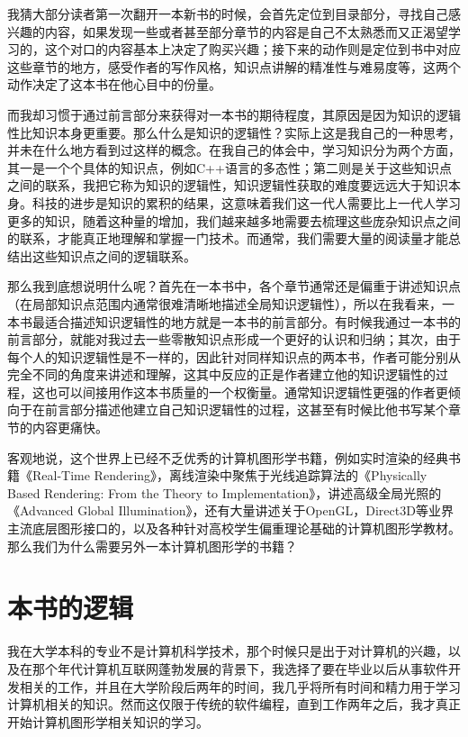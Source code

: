 \preface
{}
\mtcaddchapter 

我猜大部分读者第一次翻开一本新书的时候，会首先定位到目录部分，寻找自己感兴趣的内容，如果发现一些或者甚至部分章节的内容是自己不太熟悉而又正渴望学习的，这个对口的内容基本上决定了购买兴趣；接下来的动作则是定位到书中对应这些章节的地方，感受作者的写作风格，知识点讲解的精准性与难易度等，这两个动作决定了这本书在他心目中的份量。

而我却习惯于通过前言部分来获得对一本书的期待程度，其原因是因为知识的逻辑性比知识本身更重要。那么什么是知识的逻辑性？实际上这是我自己的一种思考，并未在什么地方看到过这样的概念。在我自己的体会中，学习知识分为两个方面，其一是一个个具体的知识点，例如C++语言的多态性；第二则是关于这些知识点之间的联系，我把它称为知识的逻辑性，知识逻辑性获取的难度要远远大于知识本身。科技的进步是知识的累积的结果，这意味着我们这一代人需要比上一代人学习更多的知识，随着这种量的增加，我们越来越多地需要去梳理这些庞杂知识点之间的联系，才能真正地理解和掌握一门技术。而通常，我们需要大量的阅读量才能总结出这些知识点之间的逻辑联系。

那么我到底想说明什么呢？首先在一本书中，各个章节通常还是偏重于讲述知识点（在局部知识点范围内通常很难清晰地描述全局知识逻辑性），所以在我看来，一本书最适合描述知识逻辑性的地方就是一本书的前言部分。有时候我通过一本书的前言部分，就能对我过去一些零散知识点形成一个更好的认识和归纳；其次，由于每个人的知识逻辑性是不一样的，因此针对同样知识点的两本书，作者可能分别从完全不同的角度来讲述和理解，这其中反应的正是作者建立他的知识逻辑性的过程，这也可以间接用作这本书质量的一个权衡量。通常知识逻辑性更强的作者更倾向于在前言部分描述他建立自己知识逻辑性的过程，这甚至有时候比他书写某个章节的内容更痛快。

客观地说，这个世界上已经不乏优秀的计算机图形学书籍，例如实时渲染的经典书籍《Real-Time Rendering》\cite{b:rtr}，离线渲染中聚焦于光线追踪算法的《Physically Based Rendering: From the Theory to Implementation》\cite{b:pbrt}，讲述高级全局光照的《Advanced Global Illumination》\cite{b:AdvancedGlobalIllumination}，还有大量讲述关于OpenGL，Direct3D等业界主流底层图形接口的，以及各种针对高校学生偏重理论基础的计算机图形学教材。那么我们为什么需要另外一本计算机图形学的书籍？



\section*{本书的逻辑}
我在大学本科的专业不是计算机科学技术，那个时候只是出于对计算机的兴趣，以及在那个年代计算机互联网蓬勃发展的背景下，我选择了要在毕业以后从事软件开发相关的工作，并且在大学阶段后两年的时间，我几乎将所有时间和精力用于学习计算机相关的知识。然而这仅限于传统的软件编程，直到工作两年之后，我才真正开始计算机图形学相关知识的学习。

